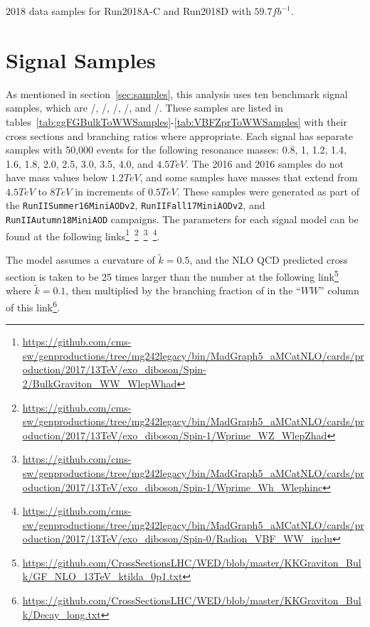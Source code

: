 \begin{table}[htbp]
  \centering
  
  \caption{
    2018 data samples for Run2018A-C and Run2018D with $59.7\unit{fb^{-1}}$.
  }
  \label{tab:dataSamples2018}
\end{table}

\section{Signal Samples}
\label{sec:sigSamples}

As mentioned in section~\ref{sec:samples}, this analysis uses ten benchmark signal samples, which are \ggF/\VBF\GBulktoWWtolnuqqbarpr, \ggF/\VBF\RadtoWWtolnuqqbarpr, \DY/\VBF\WprtoWZtolnuqqbar, \DY/\VBF\WprtoWHtolnubbbar, and \DY/\VBF\ZprtoWWtolnuqqbarpr.
These samples are listed in tables~\ref{tab:ggFGBulkToWWSamples}-\ref{tab:VBFZprToWWSamples} with their cross sections and branching ratios where appropriate.
Each signal has separate samples with 50,000 events for the following resonance masses: 0.8, 1, 1.2, 1.4, 1.6, 1.8, 2.0, 2.5, 3.0, 3.5, 4.0, and $4.5\unit{TeV}$.
The 2016 \VBF\ZprtoWW and 2016 \VBF\WprtoWZ samples do not have mass values below $1.2\unit{TeV}$, and some samples have masses that extend from $4.5\unit{TeV}$ to $8\unit{TeV}$ in increments of $0.5\unit{TeV}$.
These samples were generated as part of the \texttt{RunIISummer16MiniAODv2}, \texttt{RunIIFall17MiniAODv2}, and \texttt{RunIIAutumn18MiniAOD} campaigns.
The parameters for each signal model can be found at the following links\footnote{\url{https://github.com/cms-sw/genproductions/tree/mg242legacy/bin/MadGraph5_aMCatNLO/cards/production/2017/13TeV/exo_diboson/Spin-2/BulkGraviton_WW_WlepWhad}}~\footnote{\url{https://github.com/cms-sw/genproductions/tree/mg242legacy/bin/MadGraph5_aMCatNLO/cards/production/2017/13TeV/exo_diboson/Spin-1/Wprime_WZ_WlepZhad}}~\footnote{\url{https://github.com/cms-sw/genproductions/tree/mg242legacy/bin/MadGraph5_aMCatNLO/cards/production/2017/13TeV/exo_diboson/Spin-1/Wprime_Wh_Wlephinc}}~\footnote{\url{https://github.com/cms-sw/genproductions/tree/mg242legacy/bin/MadGraph5_aMCatNLO/cards/production/2017/13TeV/exo_diboson/Spin-0/Radion_VBF_WW_inclu}}.

The \ggF\GBulktoWW model assumes a curvature of $\tilde{k}=0.5$, and the NLO QCD predicted cross section is taken to be 25 times larger than the number at the following link\footnote{\url{https://github.com/CrossSectionsLHC/WED/blob/master/KKGraviton\_Bulk/GF\_NLO\_13TeV\_ktilda_0p1.txt}} where $\tilde{k}=0.1$, then multiplied by the branching fraction of \GBulktoWW in the ``$WW$'' column of this link\footnote{\url{https://github.com/CrossSectionsLHC/WED/blob/master/KKGraviton\_Bulk/Decay\_long.txt}}. %

